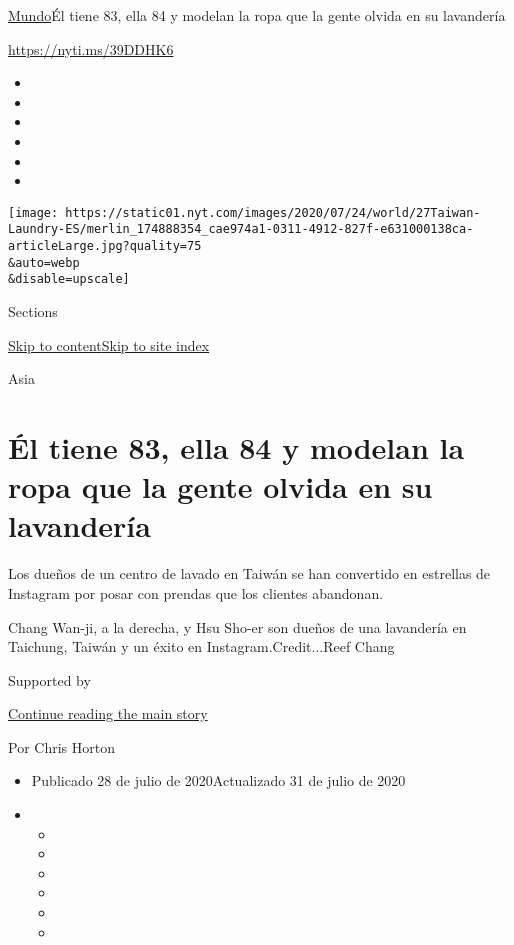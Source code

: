 \href{/es/section/mundo}{Mundo}\textbar{}Él tiene 83, ella 84 y modelan
la ropa que la gente olvida en su lavandería

\url{https://nyti.ms/39DDHK6}

\begin{itemize}
\item
\item
\item
\item
\item
\item
\end{itemize}

\texttt{[image: https://static01.nyt.com/images/2020/07/24/world/27Taiwan-Laundry-ES/merlin\_174888354\_cae974a1-0311-4912-827f-e631000138ca-articleLarge.jpg?quality=75\\\&auto=webp\\\&disable=upscale]}

Sections

\protect\hyperlink{site-content}{Skip to
content}\protect\hyperlink{site-index}{Skip to site index}

Asia

\hypertarget{uxe9l-tiene-83-ella-84-y-modelan-la-ropa-que-la-gente-olvida-en-su-lavanderuxeda}{%
\section{Él tiene 83, ella 84 y modelan la ropa que la gente olvida en
su
lavandería}\label{uxe9l-tiene-83-ella-84-y-modelan-la-ropa-que-la-gente-olvida-en-su-lavanderuxeda}}

Los dueños de un centro de lavado en Taiwán se han convertido en
estrellas de Instagram por posar con prendas que los clientes abandonan.

Chang Wan-ji, a la derecha, y Hsu Sho-er son dueños de una lavandería en
Taichung, Taiwán y un éxito en Instagram.Credit...Reef Chang

Supported by

\protect\hyperlink{after-sponsor}{Continue reading the main story}

Por Chris Horton

\begin{itemize}
\item
  Publicado 28 de julio de 2020Actualizado 31 de julio de 2020
\item
  \begin{itemize}
  \item
  \item
  \item
  \item
  \item
  \item
  \end{itemize}
\end{itemize}

